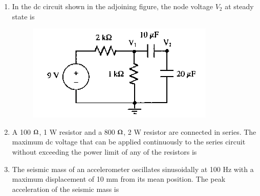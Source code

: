 \documentclass[journal,12pt,onecolumn]{IEEEtran}
\theoremstyle{remark}
\begin{document}
\begin{enumerate}
\item In the dc circuit shown in the adjoining figure, the node voltage $V_2$ at steady state is
\begin{figure}[H]
    \centering
    \includegraphics[width = 0.7\columnwidth]{q15}
    \caption*{}
    \label{fig:Q15}
\end{figure}

\hfill{}
\begin{enumerate}
\end{enumerate}

\item A 100 $\ohm$, 1 W resistor and a 800 $\ohm$, 2 W resistor are connected in series. The maximum dc voltage that can be applied continuously to the series circuit without exceeding the power limit of any of the resistors is

\hfill{}
\begin{enumerate}
\end{enumerate}

\item The seismic mass of an accelerometer oscillates sinusoidally at 100 Hz with a maximum displacement of 10 mm from its mean position. The peak acceleration of the seismic mass is

\hfill{}
\begin{enumerate}
\end{enumerate}


\end{enumerate}
\end{document}
